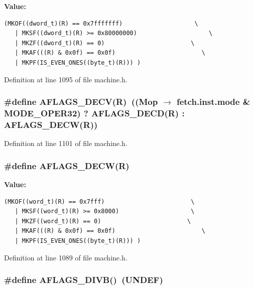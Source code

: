 \textbf{Value:}

\begin{Code}\begin{verbatim}(MKOF((dword_t)(R) == 0x7fffffff)                    \
   | MKSF((dword_t)(R) >= 0x80000000)                    \
   | MKZF((dword_t)(R) == 0)                        \
   | MKAF(((R) & 0x0f) == 0x0f)                        \
   | MKPF(IS_EVEN_ONES((byte_t)(R))) )
\end{verbatim}
\end{Code}


Definition at line 1095 of file machine.h.
\subsubsection[{AFLAGS\_\-DECV}]{\setlength{\rightskip}{0pt plus 5cm}\#define AFLAGS\_\-DECV(R)~((Mop $\rightarrow$ fetch.inst.mode \& MODE\_\-OPER32) ? AFLAGS\_\-DECD(R) : AFLAGS\_\-DECW(R))}\label{machine_8h_e48f12743003dedf3ce6d300d2112d3e}




Definition at line 1101 of file machine.h.
\subsubsection[{AFLAGS\_\-DECW}]{\setlength{\rightskip}{0pt plus 5cm}\#define AFLAGS\_\-DECW(R)}\label{machine_8h_96f00c38487d79a98827c1b282e440a2}


\textbf{Value:}

\begin{Code}\begin{verbatim}(MKOF((word_t)(R) == 0x7fff)                        \
   | MKSF((word_t)(R) >= 0x8000)                    \
   | MKZF((word_t)(R) == 0)                        \
   | MKAF(((R) & 0x0f) == 0x0f)                        \
   | MKPF(IS_EVEN_ONES((byte_t)(R))) )
\end{verbatim}
\end{Code}


Definition at line 1089 of file machine.h.
\subsubsection[{AFLAGS\_\-DIVB}]{\setlength{\rightskip}{0pt plus 5cm}\#define AFLAGS\_\-DIVB()~(UNDEF)}\label{machine_8h_12894f9a81822ea333f55d489fc05f47}




